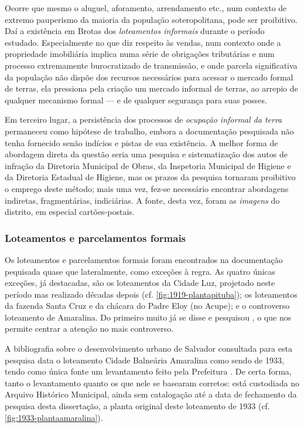 Ocorre que mesmo o aluguel, aforamento, arrendamento etc., num contexto de extremo pauperismo da maioria da população soteropolitana, pode ser proibitivo. Daí a existência em Brotas dos \textit{loteamentos informais} durante o período estudado. Especialmente no que diz respeito às vendas, num contexto onde a propriedade imobiliária implica numa série de obrigações tributárias e num processo extremamente burocratizado de transmissão, e onde parcela significativa da população não dispõe dos recursos necessários para acessar o mercado formal de terras, ela pressiona pela criação um mercado informal de terras, ao arrepio de qualquer mecanismo formal --- e de qualquer segurança para suas posses. 

Em terceiro lugar, a persistência dos processos de \textit{ocupação informal da terra} permaneceu como hipótese de trabalho, embora a documentação pesquisada não tenha fornecido senão indícios e pistas de sua existência. A melhor forma de abordagem direta da questão seria uma pesquisa e sistematização dos autos de infração da Diretoria Municipal de Obras, da Inspetoria Municipal de Higiene e da Diretoria Estadual de Higiene, mas os prazos da pesquisa tornaram proibitivo o emprego deste método; mais uma vez, fez-se necessário encontrar abordagens indiretas, fragmentárias, indiciárias. A fonte, desta vez, foram as \textit{imagens} do distrito, em especial cartões-postais.

\subsubsection{Loteamentos e parcelamentos formais}\label{subsubsec:lotparform}

Os loteamentos e parcelamentos formais foram encontrados na documentação pequisada quase que lateralmente, como exceções à regra. As quatro únicas exceções, já destacadas, são os loteamentos da Cidade Luz, projetado neste período mas realizado décadas depois (cf. \autoref{fig:1919-plantapituba}); os loteamentos da fazenda Santa Cruz e da chácara do Padre Eloy (no Acupe); e o controverso loteamento de Amaralina. Do primeiro muito já se disse e pesquisou \cite{costa1996theodoro, fernandessampaiogomes1999, salvador_loteamentos_1977, santos_theodoro_2010}, o que nos permite centrar a atenção no mais controverso.

A bibliografia sobre o desenvolvimento urbano de Salvador consultada para esta pesquisa data o loteamento Cidade Balneária Amaralina como sendo de 1933, tendo como única fonte um levantamento feito pela Prefeitura \cite{salvador_loteamentos_1977}. De certa forma, tanto o levantamento quanto os que nele se basearam corretos: está custodiada no Arquivo Histórico Municipal, ainda sem catalogação até a data de fechamento da pesquisa desta dissertação, a planta original deste loteamento de 1933 (cf. \autoref{fig:1933-plantaamaralina}). 

